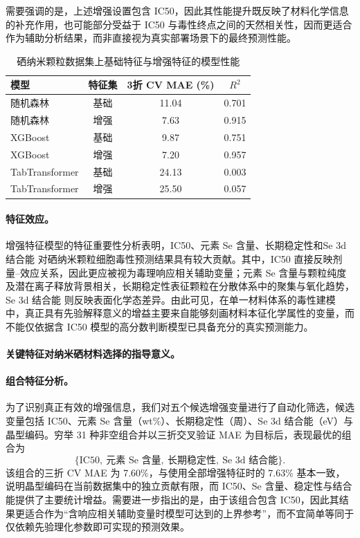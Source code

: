 \documentclass[letterpaper]{article}
\begin{document}
需要强调的是，上述增强设置包含 IC50，因此其性能提升既反映了材料化学信息的补充作用，也可能部分受益于 IC50 与毒性终点之间的天然相关性，因而更适合作为辅助分析结果，而非直接视为真实部署场景下的最终预测性能。

\begin{table}[htbp]
  \centering
  \caption{硒纳米颗粒数据集上基础特征与增强特征的模型性能}
  \label{tab:senp_main_results}
  \begin{tabular}{lccc}
    \hline
    模型 & 特征集 & 3折 CV MAE (\%) & $R^2$ \\
    \hline
    随机森林 & 基础 & 11.04 & 0.701 \\
    随机森林 & 增强 & 7.63 & 0.915 \\
    XGBoost & 基础 & 9.87 & 0.751 \\
    XGBoost & 增强 & 7.20 & 0.957 \\
    TabTransformer & 基础 & 24.13 & 0.003 \\
    TabTransformer & 增强 & 25.50 & 0.057 \\
    \hline
  \end{tabular}
\end{table}

\paragraph{特征效应。}
增强特征模型的特征重要性分析表明，IC50、元素 Se 含量、长期稳定性和Se 3d 结合能 对硒纳米颗粒细胞毒性预测结果具有较大贡献。其中，IC50 直接反映剂量--效应关系，因此更应被视为毒理响应相关辅助变量；元素 Se 含量与颗粒纯度及潜在离子释放背景相关，长期稳定性表征颗粒在分散体系中的聚集与氧化趋势，Se 3d 结合能 则反映表面化学态差异。由此可见，在单一材料体系的毒性建模中，真正具有先验解释意义的增益主要来自能够刻画材料本征化学属性的变量，而不能仅依据含 IC50 模型的高分数判断模型已具备充分的真实预测能力。

\paragraph{关键特征对纳米硒材料选择的指导意义。}

\paragraph{组合特征分析。}
为了识别真正有效的增强信息，我们对五个候选增强变量进行了自动化筛选，候选变量包括 IC50、元素 Se 含量（wt\%）、长期稳定性（周）、Se 3d 结合能（eV）与晶型编码。穷举 31 种非空组合并以三折交叉验证 MAE 为目标后，表现最优的组合为
\[
\{\text{IC50},\ \text{元素 Se 含量},\ \text{长期稳定性},\ \text{Se 3d 结合能}\}.
\]
该组合的三折 CV MAE 为 7.60\%，与使用全部增强特征时的 7.63\% 基本一致，说明晶型编码在当前数据集中的独立贡献有限，而 IC50、Se 含量、稳定性与结合能提供了主要统计增益。需要进一步指出的是，由于该组合包含 IC50，因此其结果更适合作为“含响应相关辅助变量时模型可达到的上界参考”，而不宜简单等同于仅依赖先验理化参数即可实现的预测效果。
\end{document}
